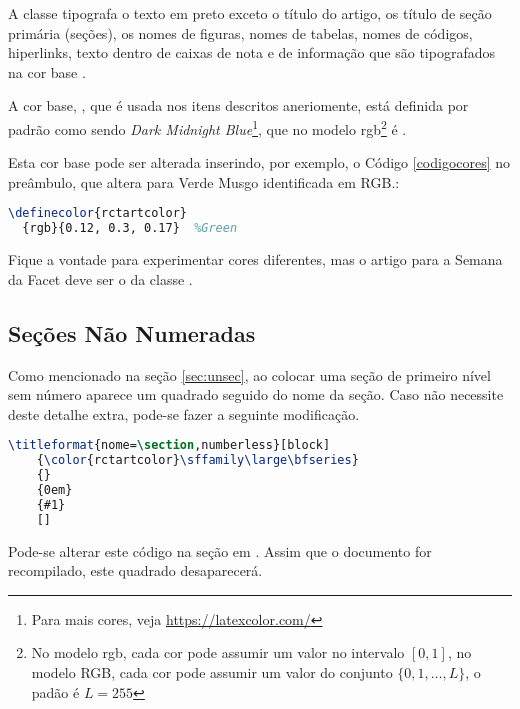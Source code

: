         A classe  tipografa o texto em preto exceto o título do artigo, os título de seção primária (seções), os nomes de figuras, nomes de tabelas, nomes de códigos, hiperlinks, texto dentro de caixas de nota e de informação que são tipografados na cor base .
        
        A cor base, , que é usada nos itens descritos aneriomente, está definida por padrão como sendo \textit{Dark Midnight Blue}\footnote{Para mais cores, veja \href{https://latexcolor.com/}{https://latexcolor.com/}}, que no modelo rgb\footnote{No modelo rgb, cada cor pode assumir um valor no intervalo $[0,1]$, no modelo RGB, cada cor pode assumir um valor do conjunto $\{0,1,\ldots,L\}$, o padão é $L=255$ } é . 
        
        Esta cor base pode ser alterada inserindo, por exemplo, o Código \ref{codigocores} no preâmbulo, que altera para Verde Musgo identificada em RGB.:
\begin{lstlisting}[language=TeX, caption=Alteração da cor base,label=codigocores]
\definecolor{rctartcolor}
  {rgb}{0.12, 0.3, 0.17}  %Green
\end{lstlisting}

Fique a vontade para experimentar cores diferentes, mas o artigo para a Semana da Facet deve ser o da classe .

 \subsection{Seções Não Numeradas}

        Como mencionado na seção \ref{sec:unsec}, ao colocar uma seção de primeiro nível sem número aparece um quadrado seguido do nome da seção. Caso não necessite deste detalhe extra, pode-se fazer a seguinte modificação.

\nolinenumbers
\begin{lstlisting}[language=TeX, caption=Seção alternativa não numerada.]
\titleformat{nome=\section,numberless}[block]
    {\color{rctartcolor}\sffamily\large\bfseries}
    {}
    {0em}
    {#1}
    []
\end{lstlisting}
\linenumbers

        Pode-se alterar este código na seção  em . Assim que o documento for recompilado, este quadrado desaparecerá. 

